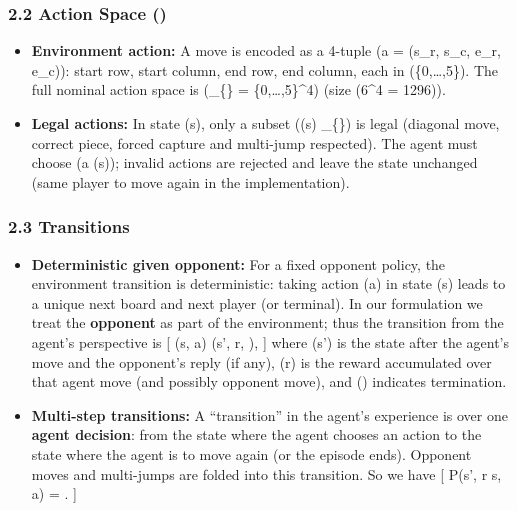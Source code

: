 \documentclass[
]{article}
\providecommand{\tightlist}{%
  \setlength{\itemsep}{0pt}\setlength{\parskip}{0pt}}
\begin{document}
\subsubsection{\texorpdfstring{2.2 Action Space
()}{2.2 Action Space ()}}\label{action-space}

\begin{itemize}
\tightlist
\item
  \textbf{Environment action:} A move is encoded as a 4-tuple (a =
  (s\_r, s\_c, e\_r, e\_c)): start row, start column, end row, end
  column, each in (\{0,\ldots,5\}). The full nominal action space is
  (\_\{\} = \{0,\ldots,5\}\^{}4) (size (6\^{}4 =
  1296)).
\item
  \textbf{Legal actions:} In state (s), only a subset ((s)
  \subseteq {}\_\{\}) is legal (diagonal move,
  correct piece, forced capture and multi-jump respected). The agent
  must choose (a \in {}(s)); invalid actions are rejected and
  leave the state unchanged (same player to move again in the
  implementation).
\end{itemize}

\subsubsection{2.3 Transitions}\label{transitions}

\begin{itemize}
\tightlist
\item
  \textbf{Deterministic given opponent:} For a fixed opponent policy,
  the environment transition is deterministic: taking action (a) in
  state (s) leads to a unique next board and next player (or terminal).
  In our formulation we treat the \textbf{opponent} as part of the
  environment; thus the transition from the agent's perspective is {[}
  (s, a) \mapsto (s', r, ), {]} where (s') is the state after
  the agent's move and the opponent's reply (if any), (r) is the reward
  accumulated over that agent move (and possibly opponent move), and
  () indicates termination.
\item
  \textbf{Multi-step transitions:} A ``transition'' in the agent's
  experience is over one \textbf{agent decision}: from the state where
  the agent chooses an action to the state where the agent is to move
  again (or the episode ends). Opponent moves and multi-jumps are folded
  into this transition. So we have {[} P(s', r \mid s, a) =
  . {]}
\end{itemize}
\end{document}
